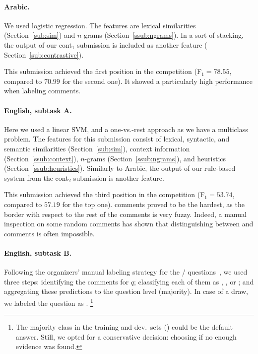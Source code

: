 \paragraph{Arabic.} 
We used logistic regression.
The features are lexical similarities (Section~\ref{sub:sim}) and  $n$-grams 
(Section~\ref{ssub:ngrams}). In a sort of stacking, the output of our 
cont$_1$ submission is included as another feature (\cf 
Section~\ref{sub:contrastive}). 

This submission achieved the first position in the competition (F$_1=78.55$, 
compared to $70.99$ for the second one). It showed a particularly high 
performance when labeling \rel comments.

\paragraph{English, subtask A.}
Here we used a linear SVM,
and a one-vs.-rest approach as we have a multiclass problem.
The features for this submission consist of lexical, syntactic, and semantic similarities 
(Section~\ref{sub:sim}), context information (Section~\ref{ssub:context}), 
$n$-grams (Section~\ref{ssub:ngrams}), and heuristics 
(Section~\ref{ssub:heuristics}). Similarly to Arabic, the output 
of our rule-based system from the cont$_2$ submission is another feature. 

This submission achieved the third position in the competition (F$_1=53.74$, 
compared to $57.19$ for the top one). \pot comments proved to be the 
hardest, as the border with respect to the rest of the comments is very fuzzy.
Indeed, a manual inspection on some random comments has shown that
distinguishing between \good and \pot comments is often impossible.

\paragraph{English, subtask B.}

Following the organizers' manual labeling strategy for the \yes/\no 
questions~\cite{Marquez-EtAl:2015:SemEval}, we used three steps:
\Ni identifying the \good comments for $q$;
\Nii classifying each of them as \yes, \no, or \unsure; and 
\Niii aggregating these predictions to the question level (majority).
In case of a draw, we labeled the question as \unsure.%
\footnote{The majority class in the training and dev.\ sets (\yes) could be the default answer.
Still, we opted for a conservative decision: choosing \unsure if no enough evidence was found.}


